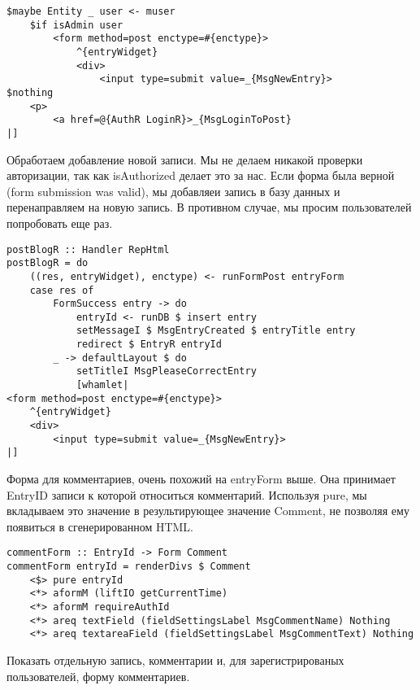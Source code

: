 \begin{lstlisting}
$maybe Entity _ user <- muser
    $if isAdmin user
        <form method=post enctype=#{enctype}>
            ^{entryWidget}
            <div>
                <input type=submit value=_{MsgNewEntry}>
$nothing
    <p>
        <a href=@{AuthR LoginR}>_{MsgLoginToPost}
|]
\end{lstlisting}
 
Обработаем добавление новой записи. Мы не делаем никакой проверки авторизации, так как isAuthorized делает это за нас. Если форма была верной (form submission was valid), мы добавляеи запись в базу данных и перенаправляем на новую запись. В противном случае, мы просим пользователей попробовать еще раз. 
 
\begin{lstlisting}
postBlogR :: Handler RepHtml
postBlogR = do
    ((res, entryWidget), enctype) <- runFormPost entryForm
    case res of
        FormSuccess entry -> do
            entryId <- runDB $ insert entry
            setMessageI $ MsgEntryCreated $ entryTitle entry
            redirect $ EntryR entryId
        _ -> defaultLayout $ do
            setTitleI MsgPleaseCorrectEntry
            [whamlet|
<form method=post enctype=#{enctype}>
    ^{entryWidget}
    <div>
        <input type=submit value=_{MsgNewEntry}>
|]
\end{lstlisting}
 
Форма для комментариев, очень похожий на entryForm выше. Она принимает EntryID записи к которой относиться комментарий. Используя pure, мы вкладываем это значение в результирующее значение Comment, не позволяя ему появиться в сгенерированном HTML. 
 
\begin{lstlisting}
commentForm :: EntryId -> Form Comment
commentForm entryId = renderDivs $ Comment
    <$> pure entryId
    <*> aformM (liftIO getCurrentTime)
    <*> aformM requireAuthId
    <*> areq textField (fieldSettingsLabel MsgCommentName) Nothing
    <*> areq textareaField (fieldSettingsLabel MsgCommentText) Nothing
\end{lstlisting}
 
Показать отдельную запись, комментарии и, для зарегистрированых пользователей, форму комментариев.
 
